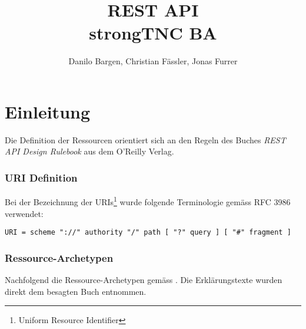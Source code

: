 \documentclass[10pt,a4paper]{scrartcl}
\author{Danilo Bargen, Christian Fässler, Jonas Furrer}
\title{REST API\\strongTNC BA}
\let\textquotedbl="
\begin{document}
\begin{titlepage}
	\maketitle
	\vspace{120mm}
	\thispagestyle{empty} %
\end{titlepage}

\newpage
	\tableofcontents
\newpage

\section{Einleitung}

Die Definition der Ressourcen orientiert sich an den Regeln des Buches
\textit{REST API Design Rulebook} \cite{masse2011rest} aus dem O'Reilly Verlag.

\subsubsection*{URI Definition}

Bei der Bezeichnung der URIs\footnote{Uniform Resource Identifier} wurde folgende Terminologie gemäss RFC 3986 verwendet:

\texttt{URI = scheme \textquotedbl ://\textquotedbl{} authority \textquotedbl /\textquotedbl{}
path [ \textquotedbl ?\textquotedbl{} query ] [ \textquotedbl \#\textquotedbl{} fragment ]}

\subsubsection*{Ressource-Archetypen}

Nachfolgend die Ressource-Archetypen gemäss \cite{masse2011rest}. Die Erklärungstexte wurden direkt dem besagten
Buch entnommen.
\end{document}
